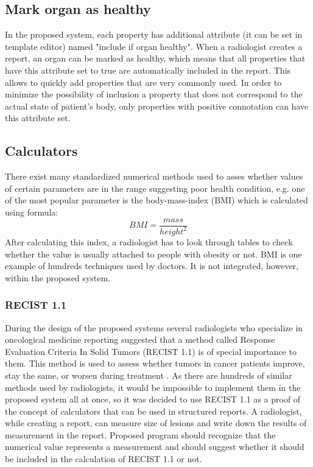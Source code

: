 \documentclass[12pt, twoside, openany]{report}
\theoremstyle{definition}
\begin{document}
\subsection{Mark organ as healthy}
In the proposed system, each property has additional attribute (it can be set in template editor) named "include if organ healthy". When a radiologist creates a report, an organ can be marked as healthy, which means that all properties that have this attribute set to true are automatically included in the report. This allows to quickly add properties that are very commonly used. 
In order to minimize the possibility of inclusion a  property that does not correspond to the actual state of patient's body, only properties with positive connotation can have this attribute set. 

\subsection{Calculators}
There exist many standardized numerical methods used to asses whether values of certain parameters are in the range suggesting poor health condition, e.g. one of the most popular parameter is the body-mass-index (BMI) which is calculated using formula:
\begin{equation}
BMI=\frac{mass}{height^2}
\end{equation} 
After calculating this index, a radiologist has to look through tables to check whether the value is usually attached to people with obesity or not. 
BMI is one example of hundreds techniques used by doctors. It is not integrated, however, within the proposed system.

\subsubsection{RECIST 1.1}
During the design of the proposed systems several radiologists who specialize in oncological medicine reporting suggested that a method called  Response Evaluation Criteria In Solid Tumors (RECIST 1.1) is of special importance to them. This method is used to assess whether tumors in cancer patients improve, stay the same, or worsen during treatment \cite{wiki-recist}. As there are hundreds of similar methods used by radiologists, it would be impossible to implement them in the proposed system all at once, so it was decided to use RECIST 1.1 as a proof of the concept of calculators that can be used in structured reports.
A radiologist, while creating a report, can measure size of lesions and write down the results of measurement in the report. Proposed program should recognize that the numerical value represents a measurement and should suggest whether it should be included in the calculation of RECIST 1.1 or not.
\end{document}
